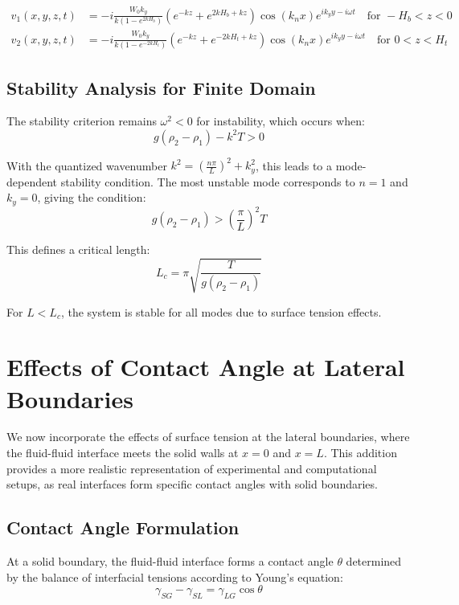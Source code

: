 \documentclass[12pt,a4paper]{article}
\begin{document}
\begin{align}
v_1(x,y,z,t) &= -i\frac{W_0 k_y}{k(1-e^{2kH_b})}(e^{-kz}+e^{2kH_b+kz})\cos(k_n x)e^{ik_y y-i\omega t} \quad \text{for } -H_b < z < 0 \\
v_2(x,y,z,t) &= -i\frac{W_0 k_y}{k(1-e^{-2kH_t})}(e^{-kz}+e^{-2kH_t+kz})\cos(k_n x)e^{ik_y y-i\omega t} \quad \text{for } 0 < z < H_t
\end{align}

\subsection{Stability Analysis for Finite Domain}
The stability criterion remains $\omega^2 < 0$ for instability, which occurs when:
\begin{equation}
g(\rho_2 - \rho_1) - k^2T > 0
\end{equation}

With the quantized wavenumber $k^2 = \left(\frac{n\pi}{L}\right)^2 + k_y^2$, this leads to a mode-dependent stability condition. The most unstable mode corresponds to $n = 1$ and $k_y = 0$, giving the condition:
\begin{equation}
g(\rho_2 - \rho_1) > \left(\frac{\pi}{L}\right)^2 T
\end{equation}

This defines a critical length:
\begin{equation}
L_c = \pi\sqrt{\frac{T}{g(\rho_2 - \rho_1)}}
\end{equation}

For $L < L_c$, the system is stable for all modes due to surface tension effects.

\section{Effects of Contact Angle at Lateral Boundaries}
We now incorporate the effects of surface tension at the lateral boundaries, where the fluid-fluid interface meets the solid walls at $x = 0$ and $x = L$. This addition provides a more realistic representation of experimental and computational setups, as real interfaces form specific contact angles with solid boundaries.

\subsection{Contact Angle Formulation}
At a solid boundary, the fluid-fluid interface forms a contact angle $\theta$ determined by the balance of interfacial tensions according to Young's equation:
\begin{equation}
\gamma_{SG} - \gamma_{SL} = \gamma_{LG}\cos\theta
\end{equation}
\end{document}
